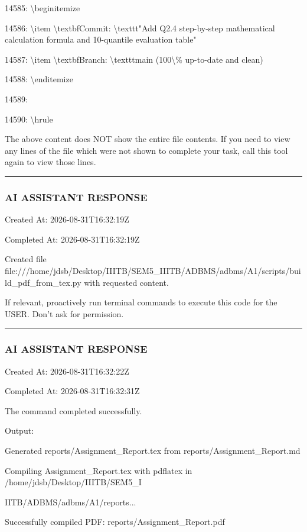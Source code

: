 \documentclass[11pt,a4paper]{article}
\begin{document}
14585: \textbackslash{}begin{itemize}

14586: \textbackslash{}item \textbackslash{}textbf{Commit}: \textbackslash{}texttt{"Add Q2.4 step-by-step mathematical calculation formula and 10-quantile evaluation table"}

14587: \textbackslash{}item \textbackslash{}textbf{Branch}: \textbackslash{}texttt{main} (100\textbackslash{}\% up-to-date and clean)

14588: \textbackslash{}end{itemize}

14589:

14590: \textbackslash{}hrule

The above content does NOT show the entire file contents. If you need to view any lines of the file which were not shown to complete your task, call this tool again to view those lines.


\hrule

\subsubsection{AI ASSISTANT RESPONSE}

Created At: 2026-08-31T16:32:19Z

Completed At: 2026-08-31T16:32:19Z

Created file file:///home/jdsb/Desktop/IIITB/SEM5\_IIITB/ADBMS/adbms/A1/scripts/build\_pdf\_from\_tex.py with requested content.

If relevant, proactively run terminal commands to execute this code for the USER. Don't ask for permission.


\hrule

\subsubsection{AI ASSISTANT RESPONSE}

Created At: 2026-08-31T16:32:22Z

Completed At: 2026-08-31T16:32:31Z


The command completed successfully.

Output:

Generated reports/Assignment\_Report.tex from reports/Assignment\_Report.md

Compiling Assignment\_Report.tex with pdflatex in /home/jdsb/Desktop/IIITB/SEM5\_I

IITB/ADBMS/adbms/A1/reports...

Successfully compiled PDF: reports/Assignment\_Report.pdf
\end{document}
